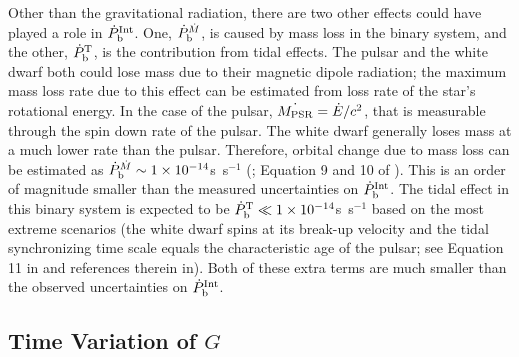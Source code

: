 Other than the gravitational radiation, there are two other effects could have played a role in
$\dot{P}_{\rm b}^{\rm Int}$. One, $\dot{P}_{\rm b}^{\dot{M}}$, is caused by mass loss in the
binary system, and the other, $\dot{P}_{\rm b}^{\rm T}$, is the contribution
from tidal effects.
The pulsar and the white dwarf both could lose mass due to their magnetic dipole radiation; the maximum
mass loss rate due to this effect can be estimated from loss rate of the
star's rotational energy. In the case of the pulsar, $\dot{M_{\rm
PSR}}=\dot{E}/c^2$, that is
measurable through the spin down rate of the pulsar.
The white dwarf generally loses mass at a much lower rate than the pulsar.
Therefore, orbital change due to mass loss can be estimated as $\dot{P}_{\rm
b}^{\dot{M}}\sim 1\times10^{-14}$s~s$^{-1}$ (\citealt{dt91}; Equation 9 and 10
of \citealt{fwe+12}). This is an order of magnitude smaller than the measured
uncertainties on $\dot{P}_{\rm b}^{\rm Int}$.
The tidal effect in this binary system is expected to be $\dot{P}_{\rm b}^{\rm
T}\ll1\times10^{-14}$s~s$^{-1}$ based on the most extreme scenarios (the white
dwarf spins at its break-up velocity and the tidal synchronizing time scale equals the
characteristic age of the pulsar; see Equation 11 in \citealt{fwe+12} and
references therein in).
Both of these extra terms are much smaller than the observed uncertainties
on $\dot{P}_{\rm b}^{\rm Int}$.


\subsection{Time Variation of $G$}
\label{sec:Gdot}


